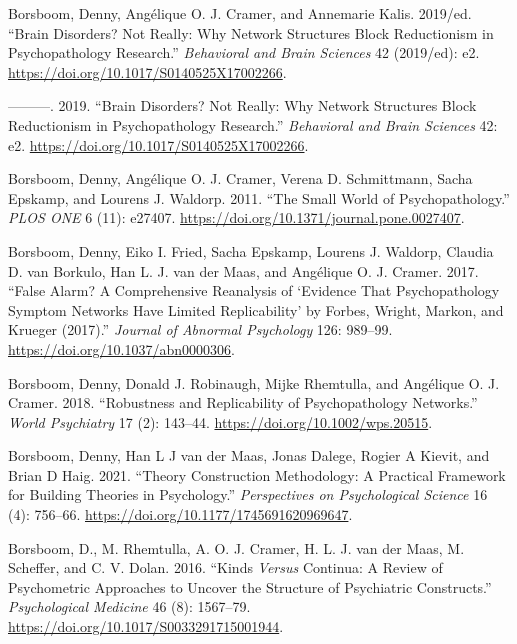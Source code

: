 \documentclass[
  letterpaper,
]{scrbook}
\newlength{\cslhangindent}
\newlength{\cslentryspacingunit} %
\newenvironment{CSLReferences}[2] %
 {%
  \setlength{\parindent}{0pt}
  \ifodd #1
  \let\oldpar\par
  \def\par{\hangindent=\cslhangindent\oldpar}
  \fi
  \setlength{\parskip}{#2\cslentryspacingunit}
 }%
 {}
\begin{document}
\begin{CSLReferences}{1}{0}
\leavevmode{}%
Borsboom, Denny, Angélique O. J. Cramer, and Annemarie Kalis. 2019/ed.
{``Brain Disorders? {Not} Really: {Why} Network Structures Block
Reductionism in Psychopathology Research.''} \emph{Behavioral and Brain
Sciences} 42 (2019/ed): e2.
\url{https://doi.org/10.1017/S0140525X17002266}.

\leavevmode{}%
---------. 2019. {``Brain Disorders? Not Really: Why Network Structures
Block Reductionism in Psychopathology Research.''} \emph{Behavioral and
Brain Sciences} 42: e2. \url{https://doi.org/10.1017/S0140525X17002266}.

\leavevmode{}%
Borsboom, Denny, Angélique O. J. Cramer, Verena D. Schmittmann, Sacha
Epskamp, and Lourens J. Waldorp. 2011. {``The {Small World} of
{Psychopathology}.''} \emph{PLOS ONE} 6 (11): e27407.
\url{https://doi.org/10.1371/journal.pone.0027407}.

\leavevmode{}%
Borsboom, Denny, Eiko I. Fried, Sacha Epskamp, Lourens J. Waldorp,
Claudia D. van Borkulo, Han L. J. van der Maas, and Angélique O. J.
Cramer. 2017. {``False Alarm? {A} Comprehensive Reanalysis of
{`{Evidence} That Psychopathology Symptom Networks Have Limited
Replicability'} by {Forbes}, {Wright}, {Markon}, and {Krueger}
(2017).''} \emph{Journal of Abnormal Psychology} 126: 989--99.
\url{https://doi.org/10.1037/abn0000306}.

\leavevmode{}%
Borsboom, Denny, Donald J. Robinaugh, Mijke Rhemtulla, and Angélique O.
J. Cramer. 2018. {``Robustness and Replicability of Psychopathology
Networks.''} \emph{World Psychiatry} 17 (2): 143--44.
\url{https://doi.org/10.1002/wps.20515}.

\leavevmode{}%
Borsboom, Denny, Han L J van der Maas, Jonas Dalege, Rogier A Kievit,
and Brian D Haig. 2021. {``Theory {Construction Methodology}: {A
Practical Framework} for {Building Theories} in {Psychology}.''}
\emph{Perspectives on Psychological Science} 16 (4): 756--66.
\url{https://doi.org/10.1177/1745691620969647}.

\leavevmode{}%
Borsboom, D., M. Rhemtulla, A. O. J. Cramer, H. L. J. van der Maas, M.
Scheffer, and C. V. Dolan. 2016. {``Kinds {\emph{Versus}} Continua: A
Review of Psychometric Approaches to Uncover the Structure of
Psychiatric Constructs.''} \emph{Psychological Medicine} 46 (8):
1567--79. \url{https://doi.org/10.1017/S0033291715001944}.


\end{CSLReferences}
\end{document}

